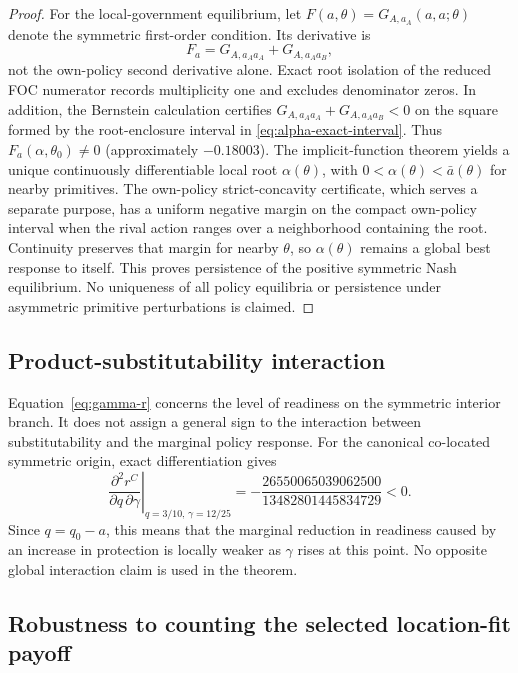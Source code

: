 \begin{proof}
For the local-government equilibrium, let $F(a,\theta)=G_{A,a_A}(a,a;\theta)$ denote the symmetric first-order condition. Its derivative is
\begin{equation}
F_a=G_{A,a_Aa_A}+G_{A,a_Aa_B},
\label{eq:diagonal-foc-derivative}
\end{equation}
not the own-policy second derivative alone. Exact root isolation of the reduced FOC numerator records multiplicity one and excludes denominator zeros. In addition, the Bernstein calculation certifies $G_{A,a_Aa_A}+G_{A,a_Aa_B}<0$ on the square formed by the root-enclosure interval in \eqref{eq:alpha-exact-interval}. Thus $F_a(\alpha,\theta_0)\neq0$ (approximately $-0.18003$). The implicit-function theorem yields a unique continuously differentiable local root $\alpha(\theta)$, with $0<\alpha(\theta)<\bar a(\theta)$ for nearby primitives. The own-policy strict-concavity certificate, which serves a separate purpose, has a uniform negative margin on the compact own-policy interval when the rival action ranges over a neighborhood containing the root. Continuity preserves that margin for nearby $\theta$, so $\alpha(\theta)$ remains a global best response to itself. This proves persistence of the positive symmetric Nash equilibrium. No uniqueness of all policy equilibria or persistence under asymmetric primitive perturbations is claimed.
\end{proof}

\subsection{Product-substitutability interaction}

Equation~\eqref{eq:gamma-r} concerns the level of readiness on the symmetric interior branch. It does not assign a general sign to the interaction between substitutability and the marginal policy response. For the canonical co-located symmetric origin, exact differentiation gives
\begin{equation}
\left.\frac{\partial^2r^C}{\partial q\,\partial\gamma}\right|_{q=3/10,\,\gamma=12/25}
=-\frac{26550065039062500}{13482801445834729}<0.
\end{equation}
Since $q=q_0-a$, this means that the marginal reduction in readiness caused by an increase in protection is locally weaker as $\gamma$ rises at this point. No opposite global interaction claim is used in the theorem.

\subsection{Robustness to counting the selected location-fit payoff}\label{app:fit-robustness}

